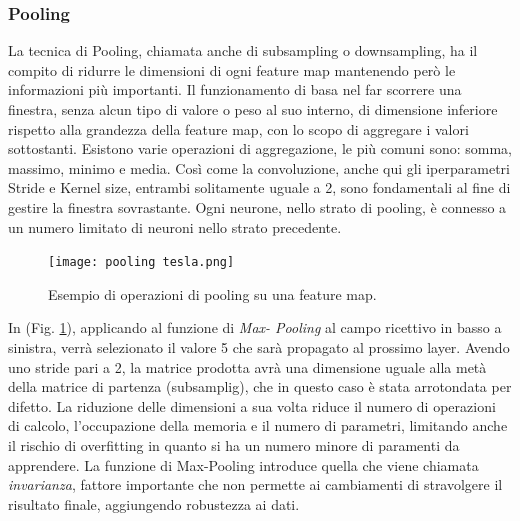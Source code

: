 \subsubsection{Pooling}
La tecnica di Pooling, chiamata anche di subsampling o downsampling, ha 
il compito di ridurre le dimensioni di ogni feature map mantenendo però 
le informazioni più importanti. Il funzionamento di basa nel far scorrere 
una finestra, senza alcun tipo di valore o peso al suo interno, di dimensione 
inferiore rispetto alla grandezza della feature map, con lo scopo di aggregare 
i valori sottostanti. Esistono varie operazioni di aggregazione, le più comuni 
sono: somma, massimo, minimo e media. Così come la convoluzione, anche 
qui gli iperparametri Stride e Kernel size, entrambi solitamente uguale 
a 2, sono fondamentali al fine di gestire la finestra sovrastante. Ogni 
neurone, nello strato di pooling, è connesso a un numero limitato di neuroni 
nello strato precedente.
\begin{figure}
    \centering
    \texttt{[image: pooling tesla.png]}
    \centering
    \caption{Esempio di operazioni di pooling su una feature map.}
    \label{pooling}
\end{figure}
In (Fig. \ref{pooling}), applicando al funzione di \emph{Max-
Pooling} al campo ricettivo in 
basso a sinistra, verrà selezionato il valore 
5 che sarà propagato al prossimo layer. Avendo uno stride pari a 2, la 
matrice prodotta avrà una dimensione uguale alla metà della matrice di 
partenza (subsamplig),  che in questo caso è stata arrotondata per difetto. 
La riduzione delle dimensioni a sua volta riduce il numero di operazioni di 
calcolo, l'occupazione della memoria e il numero di parametri, limitando 
anche il rischio di overfitting in quanto si ha un numero minore di paramenti 
da apprendere. La funzione di Max-Pooling introduce quella che viene 
chiamata \emph{invarianza}, fattore importante che non permette ai cambiamenti 
di stravolgere il risultato finale, aggiungendo robustezza ai dati.

